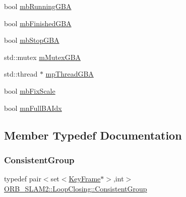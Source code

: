 \begin{DoxyCompactItemize}
\item 
bool \mbox{\hyperlink{class_o_r_b___s_l_a_m2_1_1_loop_closing_ad04c8ddd2135b81fabfa45891ab66add}{mb\+Running\+G\+BA}}
\item 
bool \mbox{\hyperlink{class_o_r_b___s_l_a_m2_1_1_loop_closing_acdfbeff51644bd4c3d2d54c637d95e6c}{mb\+Finished\+G\+BA}}
\item 
bool \mbox{\hyperlink{class_o_r_b___s_l_a_m2_1_1_loop_closing_a7e24710761d1788f395fafc16a1a8e80}{mb\+Stop\+G\+BA}}
\item 
std\+::mutex \mbox{\hyperlink{class_o_r_b___s_l_a_m2_1_1_loop_closing_a5e6e898fe4e8e5f680f840d746fa5565}{m\+Mutex\+G\+BA}}
\item 
std\+::thread $\ast$ \mbox{\hyperlink{class_o_r_b___s_l_a_m2_1_1_loop_closing_aeb14401ffb2cafdcef9f0a0323db6296}{mp\+Thread\+G\+BA}}
\item 
bool \mbox{\hyperlink{class_o_r_b___s_l_a_m2_1_1_loop_closing_a11865c48bbad102b5177e4350de71bd4}{mb\+Fix\+Scale}}
\item 
bool \mbox{\hyperlink{class_o_r_b___s_l_a_m2_1_1_loop_closing_a52f6cde58a060bee5aa6d4e5b8d53cea}{mn\+Full\+B\+A\+Idx}}
\end{DoxyCompactItemize}


\subsection{Member Typedef Documentation}
\mbox{\label{class_o_r_b___s_l_a_m2_1_1_loop_closing_a8efed418be885643d3c43113ff1d7bb2}} 
\subsubsection{\texorpdfstring{Consistent\+Group}{ConsistentGroup}}
{\footnotesize\ttfamily typedef pair$<$set$<$\mbox{\hyperlink{class_o_r_b___s_l_a_m2_1_1_key_frame}{Key\+Frame}}$\ast$$>$,int$>$ \mbox{\hyperlink{class_o_r_b___s_l_a_m2_1_1_loop_closing_a8efed418be885643d3c43113ff1d7bb2}{O\+R\+B\+\_\+\+S\+L\+A\+M2\+::\+Loop\+Closing\+::\+Consistent\+Group}}}

\mbox{\label{class_o_r_b___s_l_a_m2_1_1_loop_closing_ae9ada143a8308ce32990a7c7b5d533ab}} 
